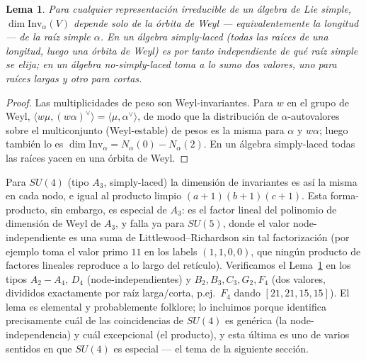 \documentclass[11pt,a4paper]{article}
\newtheorem{lema}{Lema}
\begin{document}
\begin{lema}\label{lem:node}
Para cualquier representación irreducible de un álgebra de Lie simple, $\dim\mathrm{Inv}_\alpha(V)$
depende solo de la órbita de Weyl --- equivalentemente la longitud --- de la raíz simple
$\alpha$. En un álgebra simply-laced (todas las raíces de una longitud, luego una órbita de
Weyl) es por tanto independiente de qué raíz simple se elija; en un álgebra no-simply-laced toma
a lo sumo dos valores, uno para raíces largas y otro para cortas.
\end{lema}

\begin{proof}
Las multiplicidades de peso son Weyl-invariantes. Para $w$ en el grupo de Weyl,
$\langle w\mu,(w\alpha)^\vee\rangle=\langle\mu,\alpha^\vee\rangle$, de modo que la distribución
de $\alpha$-autovalores sobre el multiconjunto (Weyl-estable) de pesos es la misma para $\alpha$
y $w\alpha$; luego también lo es $\dim\mathrm{Inv}_\alpha=N_\alpha(0)-N_\alpha(2)$. En un álgebra
simply-laced todas las raíces yacen en una órbita de Weyl.
\end{proof}

Para $SU(4)$ (tipo $A_3$, simply-laced) la dimensión de invariantes es así la misma en cada
nodo, e igual al producto limpio $(a+1)(b+1)(c+1)$. Esta forma-producto, sin embargo, es
especial de $A_3$: es el factor lineal del polinomio de dimensión de Weyl de $A_3$, y falla ya
para $SU(5)$, donde el valor node-independiente es una suma de Littlewood--Richardson sin tal
factorización (por ejemplo toma el valor primo $11$ en los labels $(1,1,0,0)$, que ningún
producto de factores lineales reproduce a lo largo del retículo). Verificamos el
Lema~\ref{lem:node} en los tipos $A_2\!-\!A_4,\,D_4$ (node-independientes) y
$B_2,B_3,C_3,G_2,F_4$ (dos valores, divididos exactamente por raíz larga/corta, p.ej.\ $F_4$
dando $[21,21,15,15]$). El lema es elemental y probablemente folklore; lo incluimos porque
identifica precisamente cuál de las coincidencias de $SU(4)$ es genérica (la
node-independencia) y cuál excepcional (el producto), y esta última es uno de varios sentidos
en que $SU(4)$ es especial --- el tema de la siguiente sección.

\end{document}
